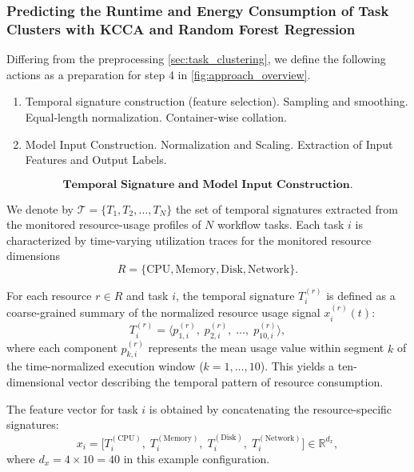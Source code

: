 \subsubsection{Predicting the Runtime and Energy Consumption of Task Clusters with KCCA and Random Forest Regression}
\label{sec:prediciton_kcca_rfr}

\label{sec:data_preprocessing_predictive}

Differing from the preprocessing \ref{sec:task_clustering}, we define the following actions as a preparation for step 4 in \ref{fig:approach_overview}.


\begin{enumerate}
    \item Temporal signature construction (feature selection).
          \subitem Sampling and smoothing.
          \subitem Equal-length normalization.
          \subitem Container-wise collation.
    \item Model Input Construction.
          \subitem Normalization and Scaling.
          \subitem Extraction of Input Features and Output Labels.
\end{enumerate}


\[
    \textbf{Temporal Signature and Model Input Construction.}
\]

We denote by \( \mathcal{T} = \{ T_1, T_2, \dots, T_N \} \) the set of
temporal signatures extracted from the monitored resource-usage profiles
of \( N \) workflow tasks.
Each task \( i \) is characterized by time-varying utilization traces
for the monitored resource dimensions
\[
    R = \{ \text{CPU}, \text{Memory}, \text{Disk}, \text{Network} \}.
\]

\noindent
For each resource \( r \in R \) and task \( i \),
the temporal signature \( T_i^{(r)} \) is defined as a
coarse-grained summary of the normalized resource usage signal
\( x_i^{(r)}(t) \):
\[
    T_i^{(r)} =
    \bigl\langle
    p_{1,i}^{(r)},\;
    p_{2,i}^{(r)},\;
    \dots,\;
    p_{10,i}^{(r)}
    \bigr\rangle,
    \tag{1}
\]
where each component \( p_{k,i}^{(r)} \) represents the mean
usage value within segment \( k \) of the time-normalized
execution window (\( k = 1, \dots, 10 \)).
This yields a ten-dimensional vector describing the temporal pattern of
resource consumption.

\noindent
The feature vector for task \( i \) is obtained by concatenating
the resource-specific signatures:
\[
    x_i =
    \bigl[
    T_i^{(\text{CPU})},\;
    T_i^{(\text{Memory})},\;
    T_i^{(\text{Disk})},\;
    T_i^{(\text{Network})}
    \bigr]
    \in \mathbb{R}^{d_x},
\]
where \( d_x = 4 \times 10 = 40 \) in this example configuration.

